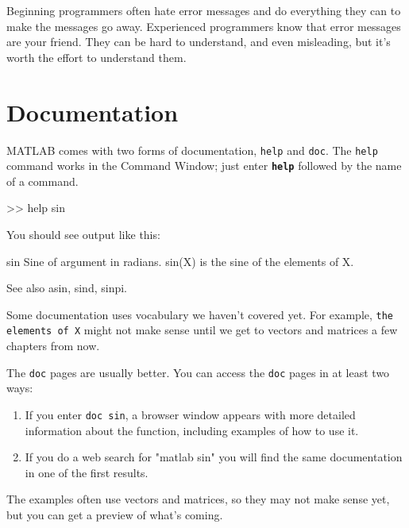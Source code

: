 \documentclass[../../book.tex]{subfiles}
\begin{document}
Beginning programmers often hate error messages and do everything they
can to make the messages go away.  Experienced programmers know that error
messages are your friend.  They can be hard to understand, and even
misleading, but it's worth the effort to understand them.

\section{Documentation}

MATLAB comes with two forms of documentation, \lstinline{help}
and \lstinline{doc}.
The \lstinline{help} command works in the Command Window; just
enter \textbf{\lstinline{help}} followed by the name of a command.


\begin{code}
>> help sin
\end{code}

You should see output like this:

\begin{stdout}
 sin    Sine of argument in radians.
    sin(X) is the sine of the elements of X.

    See also asin, sind, sinpi.
\end{stdout}

Some documentation uses vocabulary we haven't covered yet.
For example, \lstinline{the elements of X} might not make sense until
we get to vectors and matrices a few chapters from now.


The \lstinline{doc} pages are usually better.  You can access the \lstinline{doc} pages in at least two ways:

\begin{enumerate}
\item If you enter \lstinline{doc sin}, a browser window appears with more detailed information about the function, including examples of how to use it. 
\item If you do a web search for "matlab sin" you will find the same documentation in one of the first results.
\end{enumerate}
The examples often use vectors and matrices, so they may not make sense yet,
but you can get a preview of what's coming.
\end{document}
